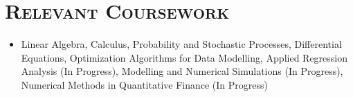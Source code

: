 \documentclass[11pt]{article}
\makeatletter
\newcommand{\headerrow}[2]
{\begin{tabular*}{\linewidth}{l@{\extracolsep{\fill}}r}
    #1 &
    #2 \\
\end{tabular*}}
\makeatother
\begin{document}
\begin{itemize}[leftmargin=0em]
%

%

\end{itemize}

\section*{\textsc{\textbf{Relevant Coursework}}}
\begin{itemize}[itemsep=0em, leftmargin=0.7em]
\item[]
    Linear Algebra,
    Calculus,
    Probability and Stochastic Processes,
    Differential Equations,
    Optimization Algorithms for Data Modelling,
    Applied Regression Analysis (In Progress),
    Modelling and Numerical Simulations (In Progress),
    Numerical Methods in Quantitative Finance (In Progress)
\end{itemize}
\end{document}
